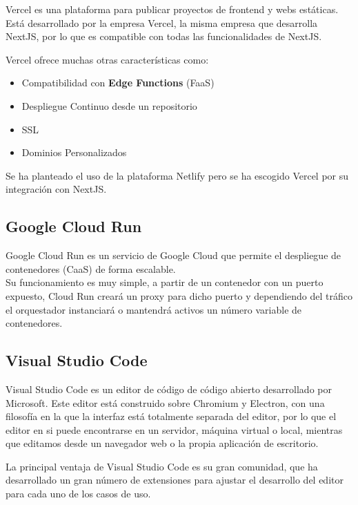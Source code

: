 Vercel es una plataforma para publicar proyectos de frontend y webs
estáticas. Está desarrollado por la empresa Vercel, la misma empresa que
desarrolla NextJS, por lo que es compatible con todas las
funcionalidades de NextJS.

Vercel ofrece muchas otras características como:

\begin{itemize}
\item
  Compatibilidad con \textbf{Edge Functions} (FaaS)
\item
  Despliegue Continuo desde un repositorio
\item
  SSL
\item
  Dominios Personalizados
\end{itemize}

Se ha planteado el uso de la plataforma Netlify pero se ha escogido
Vercel por su integración con NextJS.

\hypertarget{google-cloud-run}{%
\subsection{Google Cloud Run}\label{google-cloud-run}}

Google Cloud Run es un servicio de Google Cloud que permite el
despliegue de contenedores (CaaS) de forma escalable.\\
Su funcionamiento es muy simple, a partir de un contenedor con un puerto
expuesto, Cloud Run creará un proxy para dicho puerto y dependiendo del
tráfico el orquestador instanciará o mantendrá activos un número
variable de contenedores.

\hypertarget{visual-studio-code}{%
\subsection{Visual Studio Code}\label{visual-studio-code}}

Visual Studio Code es un editor de código de código abierto desarrollado
por Microsoft. Este editor está construido sobre Chromium y Electron,
con una filosofía en la que la interfaz está totalmente separada del
editor, por lo que el editor en si puede encontrarse en un servidor,
máquina virtual o local, mientras que editamos desde un navegador web o
la propia aplicación de escritorio.

La principal ventaja de Visual Studio Code es su gran comunidad, que ha
desarrollado un gran número de extensiones para ajustar el desarrollo
del editor para cada uno de los casos de uso.

